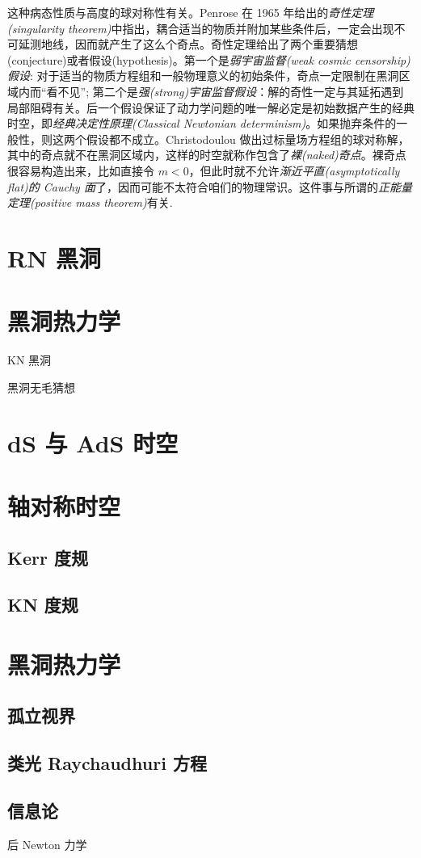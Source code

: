 这种病态性质与高度的球对称性有关。Penrose 在 1965 年给出的\textit{奇性定理(singularity theorem)}中指出，耦合适当的物质并附加某些条件后，一定会出现不可延测地线，因而就产生了这么个奇点。奇性定理给出了两个重要猜想(conjecture)或者假设(hypothesis)。第一个是\textit{弱宇宙监督(weak cosmic censorship)假设}: 对于适当的物质方程组和一般物理意义的初始条件，奇点一定限制在黑洞区域内而“看不见”; 第二个是\textit{强(strong)宇宙监督假设}：解的奇性一定与其延拓遇到局部阻碍有关。后一个假设保证了动力学问题的唯一解必定是初始数据产生的经典时空，即\textit{经典决定性原理(Classical Newtonian determinism)}。如果抛弃条件的一般性，则这两个假设都不成立。Christodoulou 做出过标量场方程组的球对称解，其中的奇点就不在黑洞区域内，这样的时空就称作包含了\textit{裸(naked)奇点}。裸奇点很容易构造出来，比如直接令 $m<0$，但此时就不允许\textit{渐近平直(asymptotically flat)的 Cauchy 面}了，因而可能不太符合咱们的物理常识。这件事与所谓的\textit{正能量定理(positive mass theorem)}有关.


\section{RN 黑洞}

\section{黑洞热力学}

KN 黑洞

黑洞无毛猜想

\section{dS 与 AdS 时空}\label{sec:dS}



\section{轴对称时空}
    \subsection{Kerr 度规}
    \subsection{KN 度规}

\section{黑洞热力学}
\subsection{孤立视界}
\subsection{类光 Raychaudhuri 方程}
\subsection{信息论}


后 Newton 力学
